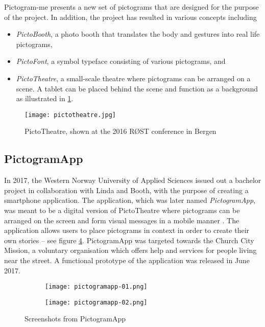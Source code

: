 Pictogram-me presents a new set of pictograms that are designed for the purpose of the project. In addition, the project has resulted in various concepts including

\begin{itemize}
    \item \emph{PictoBooth}, a photo booth that translates the body and gestures into real life pictograms,
    \item \emph{PictoFont}, a symbol typeface consisting of various pictograms, and
    \item \emph{PictoTheatre}, a small-scale theatre where pictograms can be arranged on a scene. A tablet can be placed behind the scene and function as a background as illustrated in \ref{fig:pictotheatre}.
\end{itemize}

\begin{figure}
    \centering
    \texttt{[image: pictotheatre.jpg]}
    \caption{PictoTheatre, shown at the 2016 RØST conference in Bergen}
    \label{fig:pictotheatre}
\end{figure}

\subsection{PictogramApp}

In 2017, the Western Norway University of Applied Sciences issued out a bachelor project in collaboration with Linda and Booth, with the purpose of creating a smartphone application. The application, which was later named \emph{PictogramApp}, was meant to be a digital version of PictoTheatre where pictograms can be arranged on the screen and form visual messages in a mobile manner \parencite{fure2017}. The application allows users to place pictograms in context in order to create their own stories -- see figure \ref{fig:pictogramapp}. PictogramApp was targeted towards the Church City Mission, a voluntary organisation which offers help and services for people living near the street. A functional prototype of the application was released in June 2017.

\begin{figure}
    \centering
    \begin{subfigure}{0.3\textwidth}
        \centering
        \texttt{[image: pictogramapp-01.png]}
        \label{fig:pictogramapp-list}
    \end{subfigure}
    \hspace{0.05\textwidth}
    \begin{subfigure}{0.3\textwidth}
        \centering
        \texttt{[image: pictogramapp-02.png]}
        \label{fig:pictogramapp-scene}
    \end{subfigure}
    \caption{Screenshots from PictogramApp}
    \label{fig:pictogramapp}
\end{figure}

